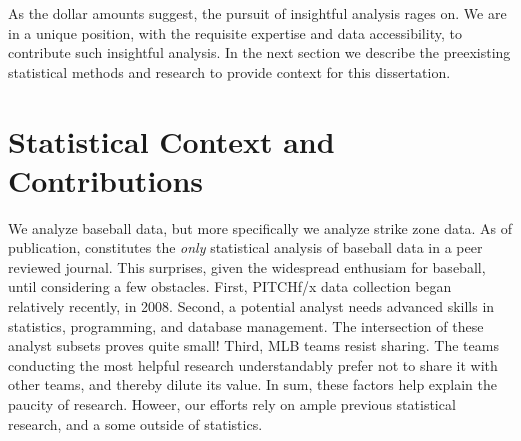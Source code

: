 As the dollar amounts suggest, the pursuit of insightful analysis rages on. We are in a unique position, with the requisite expertise and data accessibility, to contribute such insightful analysis. In the next section we describe the preexisting statistical methods and research to provide context for this dissertation.


\section{Statistical Context and Contributions}


We analyze baseball data, but more specifically we analyze strike zone data. As of publication, \cite{Cross2015} constitutes the {\it only} statistical analysis of baseball data in a peer reviewed journal. This surprises, given the widespread enthusiam for baseball, until considering a few obstacles. First, PITCHf/x\textsuperscript{\textregistered} data collection began relatively recently, in 2008. Second, a potential analyst needs advanced skills in statistics, programming, and database management. The intersection of these analyst subsets proves quite small!  Third, MLB teams resist sharing. The teams conducting the most helpful research understandably prefer not to share it with other teams, and thereby dilute its value. In sum, these factors help explain the paucity of research. Howeer, our efforts rely on ample previous statistical research, and a some outside of statistics.

